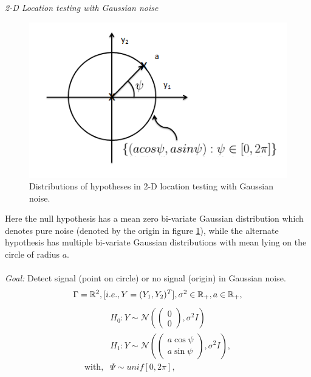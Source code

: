 \documentclass[12pt]{report}
\begin{document}
\begin{exmp}
{\em 2-D Location testing with Gaussian noise}\\

\begin{figure}[h]
\centering
\includegraphics[scale=0.8]{Figures/2D-Gaussian-loctest.png}
\caption{Distributions of hypotheses in 2-D location testing with Gaussian noise.}
\label{fig:2dgaussloctest}
\end{figure}
\noindent Here the null hypothesis has a mean zero bi-variate Gaussian distribution which denotes pure noise (denoted by the origin in figure \ref{fig:2dgaussloctest}), while the alternate hypothesis has multiple bi-variate Gaussian distributions with mean lying on the circle of radius $a$.\\
\\
{\em Goal:}  Detect signal (point on circle) or no signal (origin) in Gaussian noise.\\
\begin{align*}
\Gamma = \mathbb{R}^2,[i.e.,Y=(Y_1,Y_2)^{T}],\sigma^2 \in \mathbb{R}_+, a \in \mathbb{R}_+,\\
\end{align*}
\begin{align*}
&H_0:Y\sim\mathcal{N}(\left(\begin{smallmatrix}0 \\ 0\end{smallmatrix}\right),\sigma^2 I)\\
&H_1:Y\sim\mathcal{N}(\left(\begin{smallmatrix}a\cos{\psi} \\ a\sin{\psi}\end{smallmatrix}\right),\sigma^2 I),\\
\text{with},&\Psi\sim unif[0,2\pi],
\end{align*}

\end{exmp}
\end{document}
